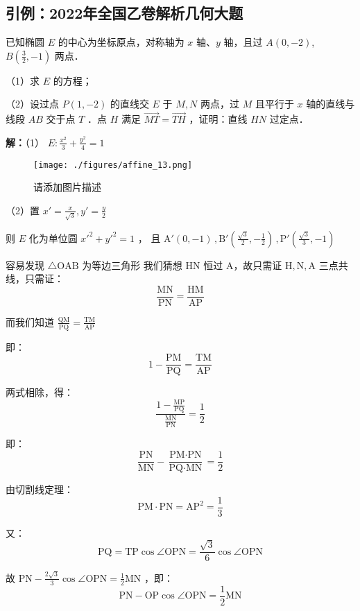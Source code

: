 \begin{issues}
\end{issues}

\subsection{引例：2022年全国乙卷解析几何大题}

已知椭圆 \(E\) 的中心为坐标原点，对称轴为 \(x\) 轴、\(y\) 轴，且过 \(A(0,-2)\),\(B(\frac{3}{2},-1)\) 两点．

（1）求 \(E\) 的方程；

（2）设过点 \(P(1,-2)\) 的直线交 \(E\) 于 \(M,N\) 两点，过 \(M\) 且平行于 \(x\) 轴的直线与线段 \(AB\) 交于点 \(T\) ．点 \(H\) 满足 \(\overrightarrow{MT}=\overrightarrow{TH}\) ，证明：直线 \(HN\) 过定点．

\textbf{解：}（1） \(E:\frac{x^2}{3}+\frac{y^2}{4}=1\)
\begin{figure}[ht]
\centering
\texttt{[image: ./figures/affine\_13.png]}
\caption{请添加图片描述} \label{affine_fig13}
\end{figure}
（2）置 \(x'=\frac{x}{\sqrt{3}},y'=\frac{y}{2}\)

则 \(E\) 化为单位圆 \(x'^2+y'^2=1\) ， 且 \(\text{A}'(0,-1)\,,\text{B}'\left(\frac{\sqrt{3}}{2},-\frac{1}{2}\right)\,,\text{P}'\left(\frac{\sqrt{3}}{3},-1\right)\)

容易发现 \(\triangle \text{OAB}\) 为等边三角形
我们猜想 \(\text{HN}\) 恒过 \(\text{A}\)，故只需证 \(\text{H},\text{N},\text{A}\) 三点共线，只需证：
$$\frac{\text{MN}}{\text{PN}}=\frac{\text{HM}}{\text{AP}}$$

而我们知道 \(\frac{\text{QM}}{\text{PQ}}=\frac{\text{TM}}{\text{AP}}\) 

即：
$$1-\frac{\text{PM}}{\text{PQ}}=\frac{\text{TM}}{\text{AP}}$$

两式相除，得：
$$\frac{1-\frac{\text{MP}}{\text{PQ}}}{\frac{\text{MN}}{\text{PN}}}=\frac{1}{2}$$

即：
$$\frac{\text{PN}}{\text{MN}}-\frac{\text{PM}\cdot\text{PN}}{\text{PQ}\cdot\text{MN}}=\frac{1}{2}$$

由切割线定理：
$${\text{PM}}\cdot{\text{PN}}=\text{AP}^2=\frac{1}3$$

又：
$$\text{PQ}=\text{TP}\cos\angle\text{OPN}=\frac{\sqrt{3}}{6}\cos\angle\text{OPN}$$

故 \(\text{PN}-\frac{2\sqrt{3}}{3}\cos\angle\text{OPN}=\frac{1}{2}\text{MN}\) ，即：
$$\text{PN}-\text{OP}\cos\angle\text{OPN}=\frac{1}{2}\text{MN}$$

